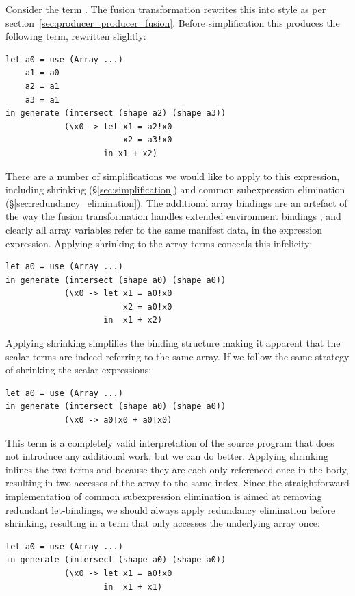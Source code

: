 Consider the term . The fusion transformation rewrites
this into  style as per
section~\ref{sec:producer_producer_fusion}. Before simplification this produces
the following term, rewritten slightly: 
%
\begin{lstlisting}[style=haskell]
let a0 = use (Array ...)
    a1 = a0
    a2 = a1
    a3 = a1
in generate (intersect (shape a2) (shape a3))
            (\x0 -> let x1 = a2!x0
                        x2 = a3!x0
                    in x1 + x2)
\end{lstlisting}
%
There are a number of simplifications we would like to apply to this expression,
including shrinking (\S\ref{sec:simplification}) and common subexpression
elimination (\S\ref{sec:redundancy_elimination}). The additional array bindings
are an artefact of the way the fusion transformation handles extended
environment bindings ,
and clearly all array variables refer to the same manifest data,  in
the expression expression. Applying shrinking to the array terms conceals this
infelicity:
%
\begin{lstlisting}[style=haskell]
let a0 = use (Array ...)
in generate (intersect (shape a0) (shape a0))
            (\x0 -> let x1 = a0!x0
                        x2 = a0!x0
                    in  x1 + x2)
\end{lstlisting}
%
Applying shrinking simplifies the binding structure making it apparent that the
scalar terms are indeed referring to the same array. If we follow the same
strategy of shrinking the scalar expressions:
%
\begin{lstlisting}[style=haskell]
let a0 = use (Array ...)
in generate (intersect (shape a0) (shape a0))
            (\x0 -> a0!x0 + a0!x0)
\end{lstlisting}
%
This term is a completely valid interpretation of the source program that does
not introduce any additional work, but we can do better. Applying shrinking
inlines the two terms  and  because they are each only
referenced once in the body, resulting in two accesses of the array to the same
index. Since the straightforward implementation of common subexpression
elimination is aimed at removing redundant let-bindings, we should always apply
redundancy elimination before shrinking, resulting in a term that only accesses
the underlying array once:
%
\begin{lstlisting}[style=haskell]
let a0 = use (Array ...)
in generate (intersect (shape a0) (shape a0))
            (\x0 -> let x1 = a0!x0
                    in  x1 + x1)
\end{lstlisting}


